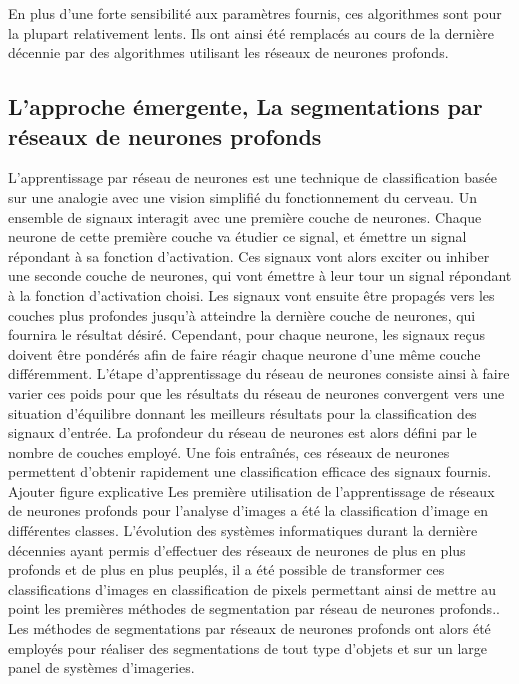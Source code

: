 \documentclass[\main/main.tex]{subfiles}
\begin{document}
%
En plus d'une forte sensibilité aux paramètres fournis, ces algorithmes sont pour la plupart relativement lents.
%
Ils ont ainsi été remplacés au cours de la dernière décennie par des algorithmes utilisant les réseaux de neurones profonds.

    \subsection{L'approche émergente, La segmentations par réseaux de neurones profonds}

%
L'apprentissage par réseau de neurones est une technique de classification basée sur une analogie avec une vision simplifié du fonctionnement du cerveau.
%
Un ensemble de signaux interagit avec une première couche de neurones.
%
Chaque neurone de cette première couche va étudier ce signal, et émettre un signal répondant à sa fonction d'activation.
%
Ces signaux vont alors exciter ou inhiber une seconde couche de neurones, qui vont émettre à leur tour un signal répondant à la fonction d'activation choisi.
%
Les signaux vont ensuite être propagés vers les couches plus profondes jusqu'à atteindre la dernière couche de neurones, qui fournira le résultat désiré.
%
Cependant, pour chaque neurone, les signaux reçus doivent être pondérés afin de faire réagir chaque neurone d'une même couche différemment.
%
L'étape d'apprentissage du réseau de neurones consiste ainsi à faire varier ces poids pour que les résultats du réseau de neurones convergent vers une situation d'équilibre donnant les meilleurs résultats pour la classification des signaux d'entrée.
%
La profondeur du réseau de neurones est alors défini par le nombre de couches employé.
%
Une fois entraînés, ces réseaux de neurones permettent d'obtenir rapidement une classification efficace des signaux fournis.
\color{magenta}Ajouter figure explicative\color{black}
%
Les première utilisation de l'apprentissage de réseaux de neurones profonds pour l'analyse d'images a été la classification d'image en différentes classes\cite{lecun_1989,krizhevsky_2017,Simonyan_2014}.
%
L'évolution des systèmes informatiques durant la dernière décennies ayant permis d'effectuer des réseaux de neurones de plus en plus profonds et de plus en plus peuplés, il a été possible de transformer ces classifications d'images en classification de pixels permettant ainsi de mettre au point les premières méthodes de segmentation par réseau de neurones profonds.\cite{ronneberger_2015,milletari_2016}.
%
Les méthodes de segmentations par réseaux de neurones profonds ont alors été employés pour réaliser des segmentations de tout type d'objets et sur un large panel de systèmes d'imageries\cite{zhao_2019,xie_2020,xu_2020,zhang_2020,khan_2020,zhang_2019a}.
\end{document}
